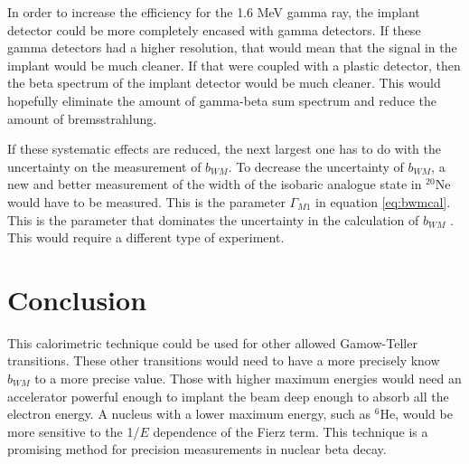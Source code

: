 \documentclass[../MaxHughesThesis.tex]{subfiles}
\begin{document}
In order to increase the efficiency for the 1.6 MeV gamma ray, the implant detector could be more completely encased with gamma detectors.
If these gamma detectors had a higher resolution, that would mean that the signal in the implant would be much cleaner.
If that were coupled with a plastic detector, then the beta spectrum of the implant detector would be much cleaner.
This would hopefully eliminate the amount of gamma-beta sum spectrum and reduce the amount of bremsstrahlung.

If these systematic effects are reduced, the next largest one has to do with the uncertainty on the measurement of $b_{WM}$.
To decrease the uncertainty of $b_{WM}$,  a new and better measurement of the width of the isobaric analogue state in $^{20}$Ne would have to be measured.
This is the parameter $\Gamma_{M1}$ in equation \ref{eq:bwmcal}.
This is the parameter that dominates the uncertainty in  the calculation of $b_{WM}$ \cite{Min11}.
This would require a different type of experiment.

\section{Conclusion}
This calorimetric technique could be used for other allowed Gamow-Teller transitions.
These other transitions would need to have a more precisely know $b_{WM}$ to a more precise value.
Those with higher maximum energies would need an accelerator powerful enough to implant the beam deep enough to absorb all the electron energy.
A nucleus with a lower maximum energy, such as $^{6}$He, would be more sensitive to the 1/$E$ dependence of the Fierz term. 
This technique is a promising method for precision measurements in nuclear beta decay.
\end{document}
